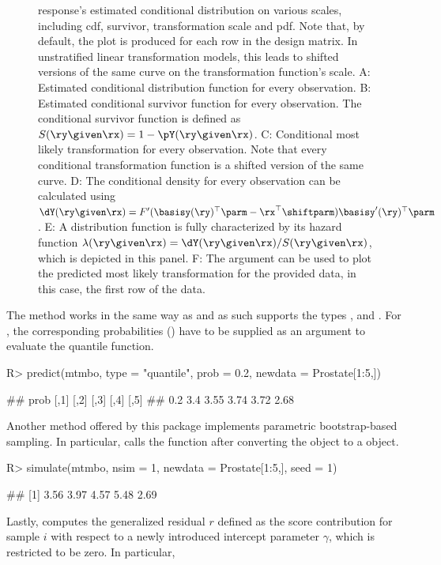 \begin{figure}[!ht]
{response's estimated conditional distribution on various scales, including cdf,
survivor, transformation scale and pdf. Note that, by default, the plot is produced
for each row in the design matrix. In unstratified linear transformation models,
this leads to shifted versions of the same curve on the transformation function's
scale.
A: Estimated conditional distribution function for every observation.
B: Estimated conditional survivor function for every observation. The conditional
survivor function is defined as $S(\ry \given \rx) = 1 - \pY(\ry \given \rx)$.
C: Conditional most likely transformation for every observation. Note that every conditional
transformation function is a shifted version of the same curve.
D: The conditional density for every observation can be calculated using
$\dY(\ry \given \rx) = F'(\basisy(\ry)^\top\parm - \rx^\top\shiftparm)\basisy'
  (\ry)^\top\parm$.
E: A distribution function is fully characterized by its hazard function
$\lambda(\ry \given \rx) = \dY(\ry \given \rx) / S(\ry \given \rx)$, which is depicted
in this panel.
F: The  argument can be used to plot the predicted most likely transformation
for the provided data, in this case, the first row of the  data.}
\label{fig:plot}
\end{figure}

The  method works in the same way as  and
as such supports the types , and . For ,
the corresponding probabilities () have to be supplied as an argument
to evaluate the quantile function.
\begin{example}
R> predict(mtmbo, type = "quantile", prob = 0.2, newdata = Prostate[1:5,])
       
## prob    [,1] [,2] [,3] [,4] [,5]
##     0.2  3.4 3.55 3.74 3.72 2.68
\end{example}
Another method offered by this package implements parametric bootstrap-based
sampling. In particular,  calls the 
function after converting the  object to a  object.
\begin{example}
R> simulate(mtmbo, nsim = 1, newdata = Prostate[1:5,], seed = 1)

## [1] 3.56 3.97 4.57 5.48 2.69
\end{example}
Lastly,  computes the generalized residual $r$ defined as
the score contribution for sample $i$ with respect to a newly introduced intercept
parameter $\gamma$, which is restricted to be zero. In particular,

